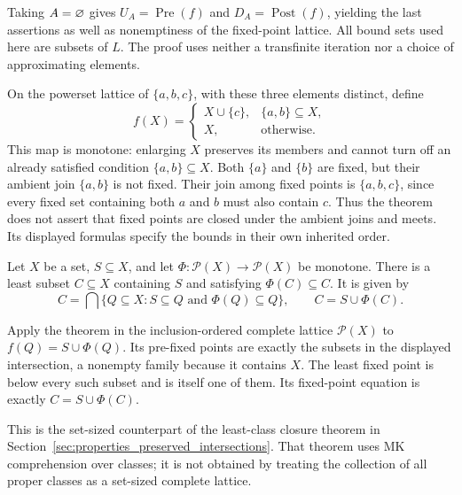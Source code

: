 Taking $A=\varnothing$ gives $U_A=\operatorname{Pre}(f)$ and
$D_A=\operatorname{Post}(f)$, yielding the last assertions as well as
nonemptiness of the fixed-point lattice. All bound sets used here are
subsets of $L$. The proof uses neither a transfinite iteration nor a
choice of approximating elements.
\Done

\begin{example}
On the powerset lattice of $\{a,b,c\}$, with these three elements
distinct, define
\[
f(X)=\begin{cases}
X\cup\{c\},&\{a,b\}\subseteq X,\\
X,&\text{otherwise}.
\end{cases}
\]
This map is monotone: enlarging $X$ preserves its members and cannot
turn off an already satisfied condition $\{a,b\}\subseteq X$.
Both $\{a\}$ and $\{b\}$ are fixed, but their ambient join
$\{a,b\}$ is not fixed. Their join among fixed points is
$\{a,b,c\}$, since every fixed set containing both $a$ and $b$ must
also contain $c$. Thus the theorem does not assert that fixed points
are closed under the ambient joins and meets. Its displayed formulas
specify the bounds in their own inherited order.
\end{example}

\begin{corollary}
Let $X$ be a set, $S\subseteq X$, and let
$\Phi:\mathcal P(X)\to\mathcal P(X)$ be monotone. There is a least
subset $C\subseteq X$ containing $S$ and satisfying $\Phi(C)\subseteq C$.
It is given by
\[
C=\bigcap\{Q\subseteq X:S\subseteq Q\text{ and }\Phi(Q)\subseteq Q\},
\qquad C=S\cup\Phi(C).
\]
\end{corollary}
\Proof
Apply the theorem in the inclusion-ordered complete lattice
$\mathcal P(X)$ to $f(Q)=S\cup\Phi(Q)$. Its pre-fixed points are
exactly the subsets in the displayed intersection, a nonempty family
because it contains $X$. The least fixed point is below every such
subset and is itself one of them. Its fixed-point equation is exactly
$C=S\cup\Phi(C)$.
\Done

This is the set-sized counterpart of the least-class closure theorem in
Section~\ref{sec:properties_preserved_intersections}. That theorem uses
MK comprehension over classes; it is not obtained by treating the
collection of all proper classes as a set-sized complete lattice.

